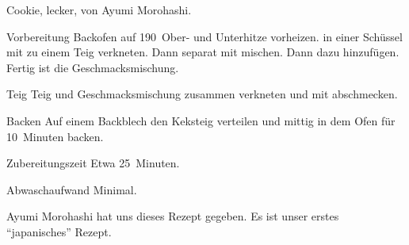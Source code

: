 \begin{recipe}{Cookie, lecker, von Ayumi Morohashi.}
	\item[Vorbereitung] Backofen auf 190\textcelsius~Ober- und Unterhitze vorheizen.
	 in einer Schüssel mit
	 zu einem Teig verkneten. Dann separat
	 mit
	 mischen. Dann dazu
	 hinzufügen. Fertig ist die Geschmacksmischung.
	\item[Teig] Teig und Geschmacksmischung zusammen verkneten und mit 
	 abschmecken.
	\item[Backen] Auf einem Backblech den Keksteig verteilen und mittig in dem Ofen für 10~Minuten backen.
	\item[Zubereitungszeit] Etwa 25~Minuten.
	\item[Abwaschaufwand] Minimal.
	\item Ayumi Morohashi hat uns dieses Rezept gegeben. Es ist unser erstes \enquote{japanisches} Rezept.
\end{recipe}
